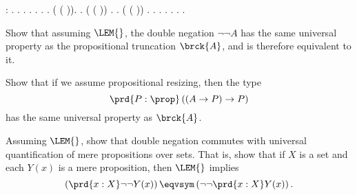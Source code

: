 \begin{coqdoccode}
\coqdocemptyline
\coqdocnoindent
{} : .\coqdoceol
\coqdocnoindent
{}.\coqdoceol
\coqdocindent{1.00em}
 .  .     .\coqdoceol
\coqdocindent{1.00em}
 . .\coqdoceol
\coqdocindent{1.00em}
 ( ( )).  .\coqdoceol
\coqdocindent{1.00em}
 ( ( ))  .  .\coqdoceol
\coqdocindent{1.00em}
 (\coqdocnotation{\ensuremath{\lnot}}  ( ))  .  . . .\coqdoceol
\coqdocindent{1.00em}
.\coqdoceol
\coqdocnoindent
{}.\coqdoceol
\coqdocemptyline
\coqdocnoindent
{} .\coqdoceol
\coqdocemptyline
\end{coqdoccode}
Show that assuming $\LEM{}$, the double negation $\lnot\lnot A$ has the same
universal property as the propositional truncation $\brck{A}$, and is therefore
equivalent to it.  


Show that if we assume propositional resizing, then the type
\[
  \prd{P:\prop}\left((A \to P) \to P\right)
\]
has the same universal property as $\brck{A}$.


Assuming $\LEM{}$, show that double negation commutes with universal
quantification of mere propositions over sets.  That is, show that if $X$ is a
set and each $Y(x)$ is a mere proposition, then $\LEM{}$ implies
\[
  \left(\prd{x:X}\lnot\lnot Y(x)\right) 
  \eqvsym
  \left(\lnot\lnot\prd{x:X} Y(x)\right).
\]


